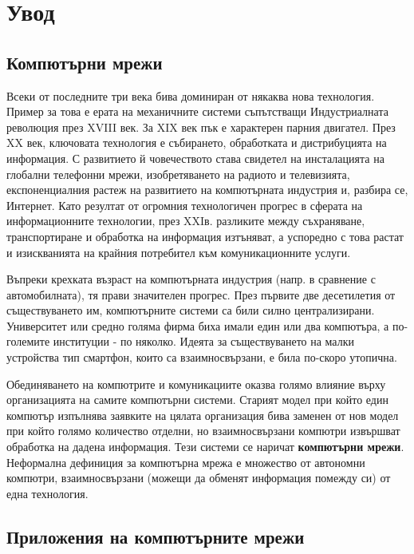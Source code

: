 \documentclass[12pt,a4paper,oneside]{book}
\begin{document}
\pagestyle{empty}

\pagestyle{plain}

\tableofcontents
\vfill
\chapter*{Увод}

\section{Компютърни мрежи}

Всеки от последните три века бива доминиран от някаква нова технология. Пример
за това е ерата на механичните системи съпътстващи Индустриалната революция през
XVIII век. За XIX век пък е характерен парния двигател. През XX век, ключовата
технология е събирането, обработката и дистрибуцията на информация. С развитието
й човечеството става свидетел на инсталацията на глобални телефонни мрежи,
изобретяването на радиото и телевизията, експоненциалния растеж на развитието на
компютърната индустрия и, разбира се, Интернет. Като резултат от огромния
технологичен прогрес в сферата на информационните технологии, през XXIв.
разликите между съхраняване, транспортиране и обработка на информация изтъняват,
а успоредно с това растат и изискванията на крайния потребител към
комуникационните услуги.

Въпреки крехката възраст на компютърната индустрия (напр. в сравнение с
автомобилната), тя прави значителен прогрес. През първите две десетилетия от
съществуването им, компютърните системи са били силно централизирани.
Университет или средно голяма фирма биха имали един или два компютъра, а
по-големите институции - по няколко. Идеята за съществуването на малки
устройства тип смартфон, които са взаимносвързани, е била по-скоро утопична.

Обединяването на компютрите и комуникациите оказва голямо влияние върху
организацията на самите компютърни системи. Старият модел при който един
компютър изпълнява заявките на цялата организация бива заменен от нов модел при
който голямо количество отделни, но взаимносвързани компютри извършват обработка
на дадена информация. Тези системи се наричат \textbf{компютърни мрежи}.
\cite{tanenbaum_computer_2011}
Неформална дефиниция за компютърна мрежа е множество от автономни компютри,
взаимносвързани (можещи да обменят информация помежду си) от една технология.

\section{Приложения на компютърните мрежи}
\end{document}
